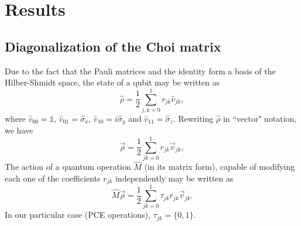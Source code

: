 \documentclass[11pt,dvipsnames]{article} %
\newcommand\dsone{\mathds{1}}
\newcommand{\1}{\mathds{1}}
\begin{document}
\section*{Results} %

\subsection*{Diagonalization of the Choi matrix}
Due to the fact that the Pauli matrices and the identity form a basis of the Hilber-Shmidt space, the state of a qubit may be written as
% 
\begin{equation}
 \hat{\rho}=\frac{1}{2}\sum_{j,k=0}^1r_{jk}\hat{v}_{jk},
\end{equation}
%
where $\hat{v}_{00}=\dsone$, $\hat{v}_{01}=\hat{\sigma}_x$, $\hat{v}_{10}=i\hat{\sigma}_y$ and $\hat{v}_{11}=\hat{\sigma}_z$.
% 
Rewriting $\hat{\rho}$ in ``vector" notation, we have
%
\begin{equation}
 \vec{\rho}=\frac{1}{2}\sum_{jk=0}^1r_{jk}\vec{v}_{jk},
\end{equation}
%
The action of a quantum operation $\hat{M}$ (in its matrix form), capable of modifying each one of the coefficients $r_{jk}$ independently may be written as
%
\begin{equation}
 \hat{M}\vec{\rho}=\frac{1}{2}\sum_{jk=0}^1\tau_{jk}r_{jk}\vec{v}_{jk}.
\end{equation}
%
In our particular case (PCE operations), $\tau_{jk}=\{0,1\}$. 
\end{document}
